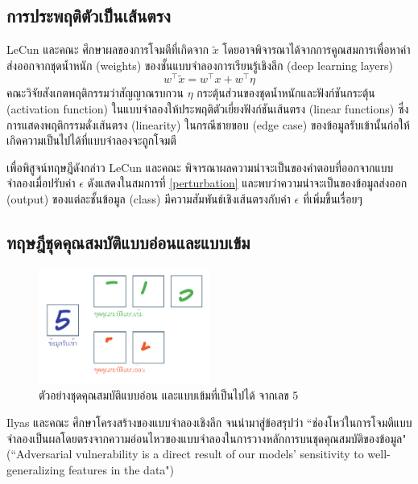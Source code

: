 \subsection{การประพฤติตัวเป็นเส้นตรง}
LeCun และคณะ \cite{1412.6572} ศึกษาผลของการโจมตีที่เกิดจาก $\tilde{x}$ โดยอาจพิจารณาได้จากการคูณสมการเพื่อหาค่าส่งออกจากชุดน้ำหนัก (weights) ของชั้นแบบจำลองการเรียนรู้เชิงลึก (deep learning layers) 
\begin{equation}
    w^\top\tilde{x} = w^\top x + w^\top \eta
\end{equation}
คณะวิจัยสังเกตพฤติกรรมว่าสัญญาณรบกวน $\eta$ กระตุ้นส่วนของชุดน้ำหนักและฟังก์ชันกระตุ้น (activation function) ในแบบจำลองให้ประพฤติตัวเยี่ยงฟังก์ชันเส้นตรง (linear functions) ซึ่งการแสดงพฤติกรรมดั่งเส้นตรง (linearity) ในกรณีชายขอบ (edge case) ของข้อมูลรับเข้านั้นก่อให้เกิดความเป็นไปได้ที่แบบจำลองจะถูกโจมตี

เพื่อพิสูจน์ทฤษฎีดังกล่าว LeCun และคณะ พิจารณาผลความน่าจะเป็นของคำตอบที่ออกจากแบบจำลองเมื่อปรับค่า $\epsilon$ ดังแสดงในสมการที่ \ref{perturbation} และพบว่าความน่าจะเป็นของข้อมูลส่งออก (output) ของแต่ละชั้นข้อมูล (class) มีความสัมพันธ์เชิงเส้นตรงกับค่า $\epsilon$ ที่เพิ่มขึ้นเรื่อยๆ

\subsection{ทฤษฎีชุดคุณสมบัติแบบอ่อนและแบบเข้ม}

\begin{figure}
    \centering
    \includegraphics[width=0.5\textwidth]{images/strong-weak-features.pdf}
    \caption{ตัวอย่างชุดคุณสมบัติแบบอ่อน และแบบเข้มที่เป็นไปได้ จากเลข 5}
    \label{5-weak-strong}
\end{figure}

Ilyas และคณะ \cite{1905.02175} ศึกษาโครงสร้างของแบบจำลองเชิงลึก จนนำมาสู่ข้อสรุปว่า ``ช่องโหว่ในการโจมตีแบบจำลองเป็นผลโดยตรงจากความอ่อนไหวของแบบจำลองในการวางหลักการบนชุดคุณสมบัติของข้อมูล" (``Adversarial vulnerability is a direct result of our models’ sensitivity to well-generalizing features in the data")

